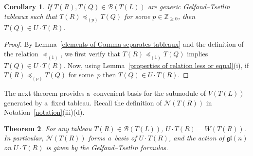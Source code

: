\documentclass[11pt]{article}
\numberwithin{equation}{section}
\newtheorem{Theorem}{Theorem}[section]
\newtheorem{Corollary}[Theorem]{Corollary}
\begin{document}
\begin{Corollary}\label{Gelfand--Tsetlin modules property}\sloppy
If $T(R), T(Q)\in \mathcal{B}(T(L))$ are generic Gelfand--Tsetlin tableaux such that
\mbox{$T(R)\preceq_{(p)} T(Q)$} for some $p\in\mathbb{Z}_{\geq 0}$, then $T(Q)\in U\cdot T(R)$.
\end{Corollary}
\begin{proof}
By Lemma~\ref{elements of Gamma separates tableaux} and the def\/inition of the relation $\preceq_{(1)}$, we f\/irst verify
that ${T(R)\preceq_{(1)}\! T(Q)}$ implies $T(Q)\in U\cdot T(R)$.
Now, using Lemma~\ref{properties of relation less or equal}(i), if $T(R)\preceq_{(p)} T(Q)$ for some~$p$ then $T(Q)\in
U\cdot T(R)$.
\end{proof}

The next theorem provides a~convenient basis for the submodule of $V(T(L))$ generated by a~f\/ixed tableau.
Recall the def\/inition of $\mathcal{N}(T(R))$ in Notation~\ref{notation}(iii)(d).

\begin{Theorem}
\label{basis of submodule generated by T}
For any tableau $T(R)\in\mathcal{B}(T(L))$, $U\cdot T(R)= W(T(R))$.
In particular, $\mathcal{N}(T(R))$ forms a~basis of $U\cdot T(R)$, and the action of $\mathfrak{gl}(n)$ on $U\cdot T(R)$
is given by the Gelfand--Tsetlin formulas.
\end{Theorem}
\end{document}
